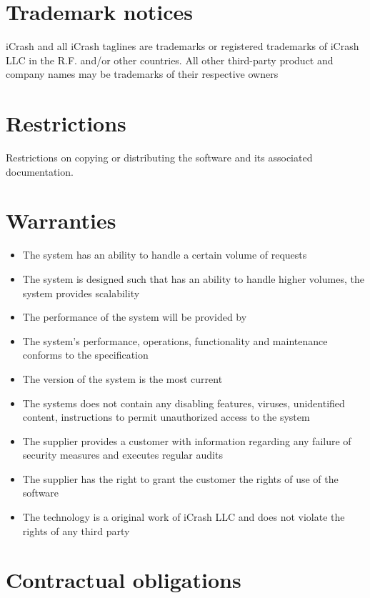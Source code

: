 \section{Trademark notices}
iCrash and all iCrash taglines are trademarks or registered trademarks of iCrash LLC in the R.F. and/or other countries. All other third-party product and company names may be trademarks of their respective owners


\section{Restrictions}
Restrictions on copying or distributing the software and its associated
documentation.

\section{Warranties}
\begin{itemize}
  \item The system has an ability to handle a certain volume of requests
  \item The system is designed such that has an ability to handle higher volumes, the system provides scalability
  \item The performance of the system will be provided by
  \item The system's performance, operations, functionality and maintenance
  conforms to the specification
  \item The version of the system is the most current
  \item The systems does not contain any disabling features, viruses, unidentified content, instructions to permit unauthorized access to the system
  \item The supplier provides a customer with information regarding any failure of security measures and executes regular audits
  \item The supplier has the right to grant the customer the rights of use of the software
  \item The technology is a original work of iCrash LLC and does not violate the rights of any third party
\end{itemize}

\section{Contractual obligations}



